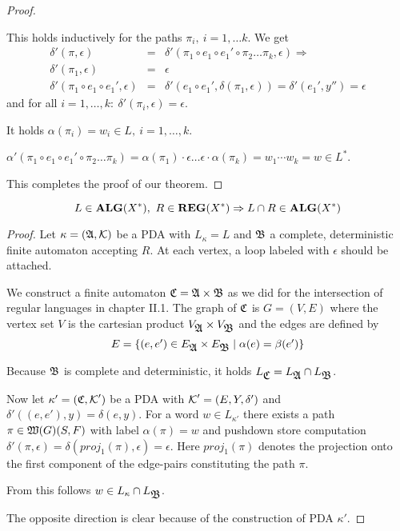 \begin{proof}
\begin{enumerate}
  This holds inductively for the paths $\pi_i,\ i = 1, \ldots k$. We get
  \begin{eqnarray*}
  \delta'(\pi, \epsilon) &=& \delta'(\pi_1 \circ e_1 \circ e_1' \circ \pi_2
  \ldots \pi_k, \epsilon) \Rightarrow \\
  \delta'(\pi_1, \epsilon) &=& \epsilon \\
  \delta'(\pi_1 \circ e_1 \circ e_1', \epsilon) &=& \delta'(e_1 \circ e_1',
  \delta(\pi_1, \epsilon)) = \delta'(e_1', y'') = \epsilon
  \end{eqnarray*}
  and for all $i = 1, \ldots, k:\ \delta'(\pi_i, \epsilon) = \epsilon$. 
  
  It holds $\alpha(\pi_i) = w_i \in L,\ i = 1, \ldots, k$.
  
  $\alpha'(\pi_1 \circ e_1 \circ e_1' \circ \pi_2 \ldots \pi_k) = \alpha(\pi_1)
  \cdot \epsilon \ldots \epsilon \cdot \alpha(\pi_k) = w_1 \cdots w_k = w \in
  L^*$.
\end{enumerate}

This completes the proof of our theorem.
\end{proof}

\bigskip
\begin{theorem}
\label{alg-lang-closure-reg-intersect}
\[ L \in \mbox{{\bf ALG}}(X^*),\ R \in \mbox{{\bf REG}}(X^*)\Rightarrow L \cap R \in \mbox{{\bf ALG}}(X^*) \]
\end{theorem}

\begin{proof}
Let $\kappa = (\mbox{$\mathfrak{A}$}, \mbox{$\mathcal{K}$})$ be a PDA with $L_{\kappa} = L$ and $\mbox{$\mathfrak{B}$}$
a complete, deterministic finite automaton accepting $R$. At each vertex, a loop
labeled with $\epsilon$ should be attached.

We construct a finite automaton $\mbox{$\mathfrak{C}$} = \mbox{$\mathfrak{A}$} \times \mbox{$\mathfrak{B}$}$ as we did for
the intersection of regular languages in chapter II.1. The graph of $\mbox{$\mathfrak{C}$}$ is
$G = (V, E)$ where the vertex set $V$ is the cartesian product $V_{\mbox{$\mathfrak{A}$}}
\times V_{\mbox{$\mathfrak{B}$}}$ and the edges are defined by
\[ E = \mbox{$\{(e, e') \in E_{\mbox{$\mathfrak{A}$}} \times E_{\mbox{$\mathfrak{B}$}} \mid \alpha(e) =
\beta(e') \}$} \]

Because $\mbox{$\mathfrak{B}$}$ is complete and deterministic, it holds $L_{\mbox{$\mathfrak{C}$}} =
L_{\mbox{$\mathfrak{A}$}} \cap L_{\mbox{$\mathfrak{B}$}}$.

Now let $\kappa' = (\mbox{$\mathfrak{C}$}, \mbox{$\mathcal{K}$}')$ be a PDA with $\mbox{$\mathcal{K}$}' = (E,
Y, \delta')$ and $\delta'((e, e'), y) = \delta(e, y)$.
For a word $w \in L_{\kappa'}$ there exists a path $\pi \in
\mbox{$\mathfrak{W}({G})$}(S, F)$ with label $\alpha(\pi) = w$ and pushdown store
computation $\delta'(\pi, \epsilon) = \delta(proj_1(\pi), \epsilon) = \epsilon$.
Here $proj_1(\pi)$ denotes the projection onto the first component of the
edge-pairs constituting the path $\pi$.

From this follows $w \in L_{\kappa} \cap L_{\mbox{$\mathfrak{B}$}}$.

The opposite direction is clear because of the construction of PDA $\kappa'$.
\end{proof}


